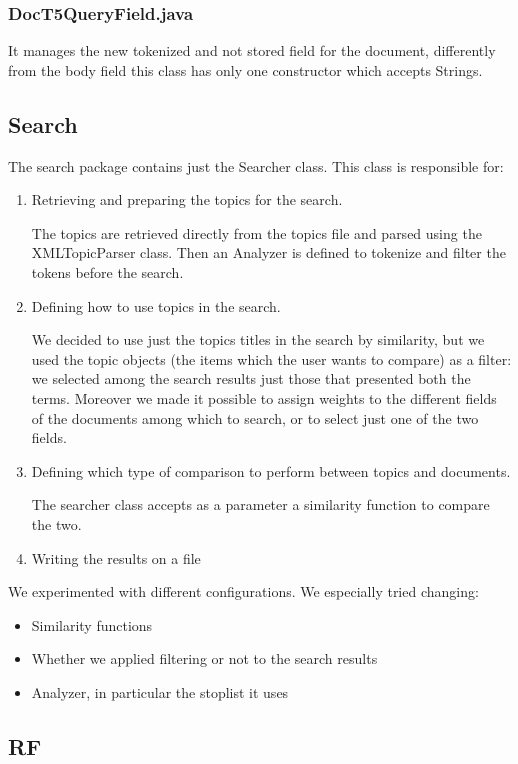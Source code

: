 \subsubsection{DocT5QueryField.java}
    
        It manages the new tokenized and not stored field for the document, differently from the body field this class has only one constructor which accepts Strings.
\subsection{Search}
  
  The search package contains just the Searcher class. This class is responsible for:
    \begin{enumerate}
    	\item Retrieving and preparing the topics for the search.
    	
    	The topics are retrieved directly from the topics file and parsed using the XMLTopicParser class.
    	Then an Analyzer is defined to tokenize and filter the tokens before the search.
    	\item Defining how to use topics in the search.
    	
    	We decided to use just the topics titles in the search by similarity, but we used the topic objects (the items which the user wants to compare) as a filter: we selected among the search results just those that presented both the terms.
    	Moreover we made it possible to assign weights to the different fields of the documents among which to search, or to select just one of the two fields.
    	\item Defining which type of comparison to perform between topics and documents.
    	
    	The searcher class accepts as a parameter a similarity function to compare the two.
    	\item Writing the results on a file
    \end{enumerate}

    We experimented with different configurations. We especially tried changing:
    \begin{itemize}
    	\item Similarity functions
    	\item Whether we applied filtering or not to the search results
    	\item Analyzer, in particular the stoplist it uses
    \end{itemize}
\subsection{RF}
  
